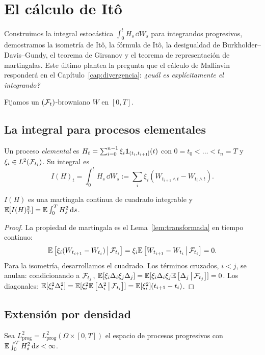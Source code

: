 \chapter{El cálculo de Itô}\label{cap:ito}

\begin{panorama}
Construimos la integral estocástica $\int_0^tH_s\,\dd W_s$ para integrandos progresivos, demostramos
la isometría de Itô, la fórmula de Itô, la desigualdad de Burkholder--Davis--Gundy, el
teorema de Girsanov y el teorema de representación de martingalas. Este último plantea la
pregunta que el cálculo de Malliavin responderá en el Capítulo~\ref{cap:divergencia}: \emph{¿cuál es explícitamente
el integrando?}
\end{panorama}

Fijamos un $(\mathcal{F}_t)$-browniano $W$ en $[0,T]$.

\section{La integral para procesos elementales}

\begin{definicion}
Un proceso \emph{elemental} es $H_t=\sum_{i=0}^{n-1}\xi_i\mathbf{1}_{(t_i,t_{i+1}]}(t)$ con $0=t_0<\dots<t_n=T$
y $\xi_i\in L^2(\mathcal{F}_{t_i})$. Su integral es
\[
  I(H)_t=\int_0^tH_s\,\dd W_s:=\sum_i\xi_i(W_{t_{i+1}\wedge t}-W_{t_i\wedge t}).
\]
\end{definicion}

\begin{lema}\label{lem:isometria-elemental}
$I(H)$ es una martingala continua de cuadrado
integrable y $\mathbb{E}[I(H)_T^2]=\mathbb{E}\int_0^TH_s^2\,\mathrm{d} s$.
\end{lema}

\begin{proof}
La propiedad de martingala es el Lema~\ref{lem:transformada} en tiempo continuo:
\[
  \mathbb{E}\left[\xi_i(W_{t_{i+1}}-W_{t_i})\,\middle|\,\mathcal{F}_{t_i}\right]=\xi_i\mathbb{E}\left[W_{t_{i+1}}-W_{t_i}\,\middle|\,\mathcal{F}_{t_i}\right]=0.
\]
Para la isometría, desarrollamos el cuadrado. Los términos cruzados, $i<j$, se anulan:
condicionando a $\mathcal{F}_{t_j}$, $\mathbb{E}[\xi_i\Delta_i\xi_j\Delta_j]=\mathbb{E}[\xi_i\Delta_i\xi_j\mathbb{E}\left[\Delta_j\,\middle|\,\mathcal{F}_{t_j}\right]]=0$. Los diagonales: $\mathbb{E}[\xi_i^2\Delta_i^2]=
\mathbb{E}[\xi_i^2\mathbb{E}\left[\Delta_i^2\,\middle|\,\mathcal{F}_{t_i}\right]]=\mathbb{E}[\xi_i^2](t_{i+1}-t_i)$.
\end{proof}

\section{Extensión por densidad}
Sea $L^2_{\mathrm{prog}}=L^2_{\mathrm{prog}}(\Omega\times[0,T])$ el espacio de procesos progresivos con $\mathbb{E}\int_0^TH_s^2\,\mathrm{d} s<\infty$.

